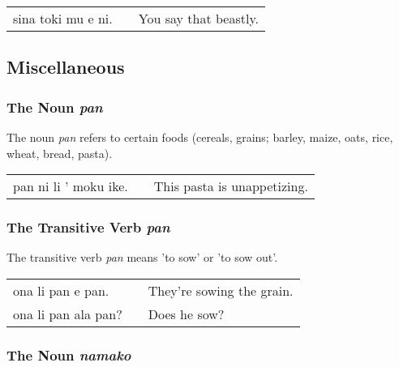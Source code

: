\begin{supertabular}{p{5,5cm}|ll}
    sina toki mu e ni. &  & You say that beastly. \\
\end{supertabular}

%
%
%
%
%
\subsection*{Miscellaneous}
%
%
%
%
\subsubsection*{The Noun \textit{pan}}
%

The noun \textit{pan} refers to certain foods (cereals, grains; barley, maize, oats, rice, wheat, bread, pasta).

\begin{supertabular}{p{5,5cm}|ll}
    pan ni li ' moku ike. &  & This pasta is unappetizing. \\
\end{supertabular}

%
%
\subsubsection*{The Transitive Verb \textit{pan}}
%

The transitive verb \textit{pan} means 'to sow' or 'to sow out'.

\begin{supertabular}{p{5,5cm}|ll}
    ona li pan e pan.   &  & They're sowing the grain. \\
    ona li pan ala pan? &  & Does he sow?              \\
\end{supertabular}

%
%
\subsubsection*{The Noun \textit{namako}}
%

